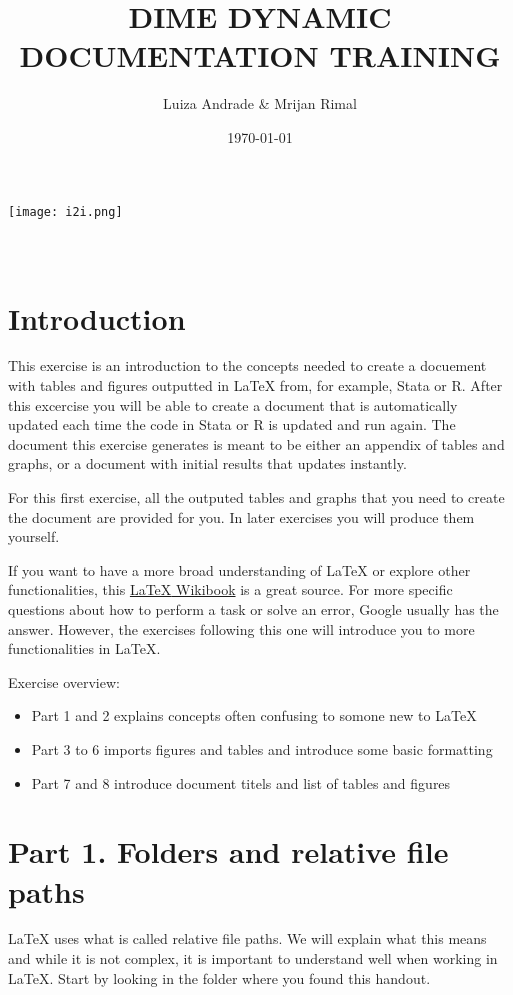 \documentclass[12pts]{report}
\title{DIME DYNAMIC DOCUMENTATION TRAINING }
\author{Luiza Andrade \& Mrijan Rimal}
\date{\today}
\begin{document}
	

\makeatletter
\begin{titlepage}
	\begin{center}
		\texttt{[image: i2i.png]}\\[10ex]
		{\LARGE \bfseries  \@title }\\[2ex] 
		{\Large  \@author}\\[20ex] 
		{\large \@date}
	\end{center}
\end{titlepage}
\makeatother

\section*{Introduction}
This exercise is an introduction to the concepts needed to create a docuement with tables and figures outputted in {\LaTeX} from, for example, Stata or R. After this excercise you will be able to create a document that is automatically updated each time the code in Stata or R is updated and run again. The document this exercise generates is meant to be either an appendix of tables and graphs, or a document with initial results that updates instantly.

For this first exercise, all the outputed tables and graphs that you need to create the document are provided for you. In later exercises you will produce them yourself.

If you want to have a more broad understanding of {\LaTeX} or explore other functionalities, this \href{https://en.wikibooks.org/wiki/LaTeX
}{{\LaTeX} Wikibook} is a great source. For more specific questions about how to perform a task or solve an error, Google usually has the answer. However, the exercises following this one will introduce you to more functionalities in {\LaTeX}.

Exercise overview:
\begin{itemize}
	\item Part 1 and 2 explains concepts often confusing to somone new to {\LaTeX}
	\item Part 3 to 6 imports figures and tables and introduce some basic formatting
	\item Part 7 and 8 introduce document titels and list of tables and figures
\end{itemize}

\section*{Part 1. Folders and relative file paths}
{\LaTeX} uses what is called relative file paths. We will explain what this means and while it is not complex, it is important to understand well when working in {\LaTeX}. Start by looking in the folder where you found this handout. 
\end{document}
